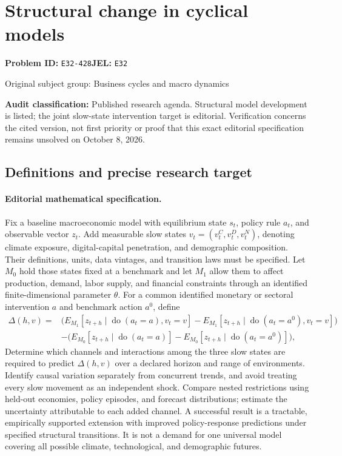 \documentclass[11pt,a4paper]{article}
\begin{document}
\section*{Structural change in cyclical models}
\textbf{Problem ID:} \texttt{E32-428}\quad \textbf{JEL:} \texttt{E32}\par
\label{problem:OP-0240}
{\sffamily\small\color{muted}Original subject group: Business cycles and macro dynamics\par}
\label{definitions:problem:30007521}
\textbf{Audit classification:} Published research agenda. Structural model development is listed; the joint slow-state intervention target is editorial. Verification concerns the cited version, not first priority or proof that this exact editorial specification remains unsolved on October 8, 2026.
\subsection*{Definitions and precise research target}
\paragraph{Editorial mathematical specification.} Fix a baseline macroeconomic model with equilibrium state \(s_t\), policy rule \(a_t\), and observable vector \(z_t\). Add measurable slow states \(v_t=(v_t^C,v_t^D,v_t^N)\), denoting climate exposure, digital-capital penetration, and demographic composition. Their definitions, units, data vintages, and transition laws must be specified. Let \(M_0\) hold those states fixed at a benchmark and let \(M_1\) allow them to affect production, demand, labor supply, and financial constraints through an identified finite-dimensional parameter \(\theta\).
For a common identified monetary or sectoral intervention \(a\) and benchmark action \(a^0\), define
\[
\begin{split}
\Delta(h,v)={}&\big(E_{M_1}[z_{t+h}\mid\operatorname{do}(a_t=a),v_t=v]
-E_{M_1}[z_{t+h}\mid\operatorname{do}(a_t=a^0),v_t=v]\big)\\
&-\big(E_{M_0}[z_{t+h}\mid\operatorname{do}(a_t=a)]
-E_{M_0}[z_{t+h}\mid\operatorname{do}(a_t=a^0)]\big),
\end{split}
\]
Determine which channels and interactions among the three slow states are required to predict \(\Delta(h,v)\) over a declared horizon and range of environments. Identify causal variation separately from concurrent trends, and avoid treating every slow movement as an independent shock. Compare nested restrictions using held-out economies, policy episodes, and forecast distributions; estimate the uncertainty attributable to each added channel. A successful result is a tractable, empirically supported extension with improved policy-response predictions under specified structural transitions. It is not a demand for one universal model covering all possible climate, technological, and demographic futures.
\end{document}
